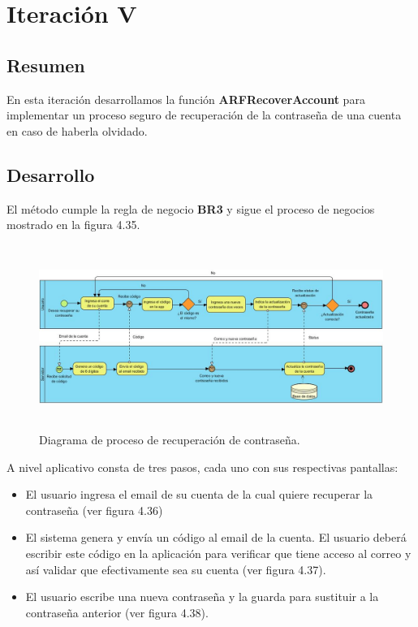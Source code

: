 \section{Iteración V}
\subsection{Resumen}
En esta iteración desarrollamos la función \textbf{ARFRecoverAccount} para implementar un proceso seguro de recuperación de la contraseña de una cuenta en caso de haberla olvidado.

\subsection{Desarrollo}
El método cumple la regla de negocio \textbf{BR3} y sigue el proceso de negocios mostrado en la figura 4.35.
\begin{figure}[h!]
	\centering
	\includegraphics[width=15cm,height=6cm]{imagenes/desarrollo/diagramas/BPMN_RECOVER.jpg}
	\caption{Diagrama de proceso de recuperación de contraseña.}
	\label{fig:recover}
\end{figure}

A nivel aplicativo consta de tres pasos, cada uno con sus respectivas pantallas:
\begin{itemize}
	\item El usuario ingresa el email de su cuenta de la cual quiere recuperar la contraseña (ver figura 4.36)
	\item El sistema genera y envía un código al email de la cuenta. El usuario deberá escribir este código en la aplicación para verificar que tiene acceso al correo y así validar que efectivamente sea su cuenta (ver figura 4.37).
	\item El usuario escribe una nueva contraseña y la guarda para sustituir a la contraseña anterior (ver figura 4.38).
\end{itemize}


